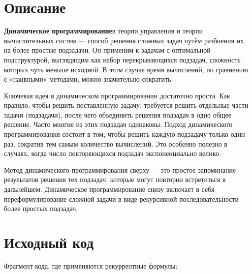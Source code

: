 \section{Описание}

\textbf{Динамическое программирование}\newline в теории управления и теории вычислительных систем — способ решения сложных задач путём разбиения их на более простые подзадачи. Он применим к задачам с оптимальной подструктурой, выглядящим как набор перекрывающихся подзадач, сложность которых чуть меньше исходной. В этом случае время вычислений, по сравнению с «наивными» методами, можно значительно сократить.\newline

Ключевая идея в динамическом программировании достаточно проста. Как правило, чтобы решить поставленную задачу, требуется решить отдельные части задачи (подзадачи), после чего объединить решения подзадач в одно общее решение. Часто многие из этих подзадач одинаковы. Подход динамического программирования состоит в том, чтобы решить каждую подзадачу только один раз, сократив тем самым количество вычислений. Это особенно полезно в случаях, когда число повторяющихся подзадач экспоненциально велико.\newline

Метод динамического программирования сверху — это простое запоминание результатов решения тех подзадач, которые могут повторно встретиться в дальнейшем. Динамическое программирование снизу включает в себя переформулирование сложной задачи в виде рекурсивной последовательности более простых подзадач.\newline
\pagebreak

\section{Исходный код}
Фрагмент кода, где применяются рекуррентные формулы:\newline


